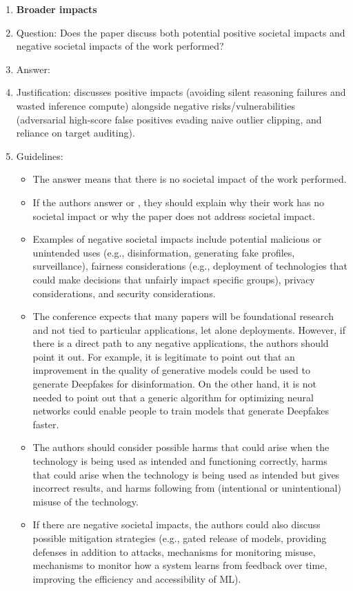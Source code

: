 \documentclass{article}
\theoremstyle{plain}
\theoremstyle{definition}
\theoremstyle{remark}
\begin{document}
\begin{enumerate}
\item {\bf Broader impacts}
    \item[] Question: Does the paper discuss both potential positive societal impacts and negative societal impacts of the work performed?
    \item[] Answer: \answerYes{}
    \item[] Justification:  discusses positive impacts (avoiding silent reasoning failures and wasted inference compute) alongside negative risks/vulnerabilities (adversarial high-score false positives evading naive outlier clipping, and reliance on target auditing).
    \item[] Guidelines:
    \begin{itemize}
        \item The answer \answerNA{} means that there is no societal impact of the work performed.
        \item If the authors answer \answerNA{} or \answerNo{}, they should explain why their work has no societal impact or why the paper does not address societal impact.
        \item Examples of negative societal impacts include potential malicious or unintended uses (e.g., disinformation, generating fake profiles, surveillance), fairness considerations (e.g., deployment of technologies that could make decisions that unfairly impact specific groups), privacy considerations, and security considerations.
        \item The conference expects that many papers will be foundational research and not tied to particular applications, let alone deployments. However, if there is a direct path to any negative applications, the authors should point it out. For example, it is legitimate to point out that an improvement in the quality of generative models could be used to generate Deepfakes for disinformation. On the other hand, it is not needed to point out that a generic algorithm for optimizing neural networks could enable people to train models that generate Deepfakes faster.
        \item The authors should consider possible harms that could arise when the technology is being used as intended and functioning correctly, harms that could arise when the technology is being used as intended but gives incorrect results, and harms following from (intentional or unintentional) misuse of the technology.
        \item If there are negative societal impacts, the authors could also discuss possible mitigation strategies (e.g., gated release of models, providing defenses in addition to attacks, mechanisms for monitoring misuse, mechanisms to monitor how a system learns from feedback over time, improving the efficiency and accessibility of ML).
    \end{itemize}


\end{enumerate}
\end{document}
